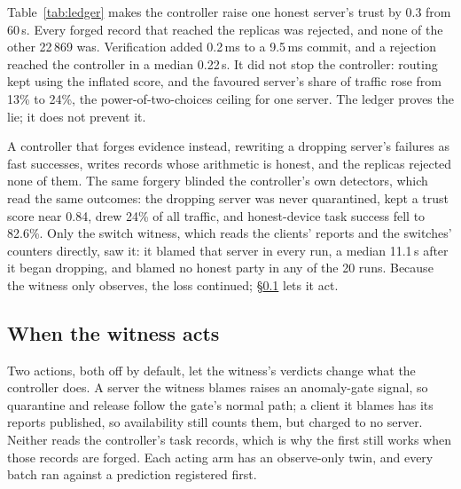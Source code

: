 \documentclass[10pt,twocolumn,letterpaper]{article}
\begin{document}
Table~\ref{tab:ledger} makes the controller raise one honest server's trust by
0.3 from 60\,s. Every forged record that reached the replicas was rejected,
and none of the other 22\,869 was. Verification added 0.2\,ms to a 9.5\,ms
commit, and a rejection reached the controller in a median 0.22\,s. It did
not stop the controller: routing kept using the inflated score, and the
favoured server's share of traffic rose from 13\% to 24\%, the
power-of-two-choices ceiling for one server. The ledger proves the lie; it
does not prevent it.

A controller that forges evidence instead, rewriting a dropping server's
failures as fast successes, writes records whose arithmetic is honest, and the
replicas rejected none of them. The same forgery blinded the controller's own
detectors, which read the same outcomes: the dropping server was never
quarantined, kept a trust score near 0.84, drew 24\% of all traffic, and
honest-device task success fell to 82.6\%. Only the switch witness, which
reads the clients' reports and the switches' counters directly, saw it: it
blamed that server in every run, a median 11.1\,s after it began dropping,
and blamed no honest party in any of the 20 runs. Because the witness only
observes, the loss continued; \S\ref{sec:res:witact} lets it act.

\subsection{When the witness acts}
\label{sec:res:witact}
Two actions, both off by default, let the witness's verdicts change what the
controller does. A server the witness blames raises an anomaly-gate signal, so
quarantine and release follow the gate's normal path; a client it blames has
its reports published, so availability still counts them, but charged to no
server. Neither reads the controller's task records, which is why the first
still works when those records are forged. Each acting arm has an observe-only
twin, and every batch ran against a prediction registered first.
\end{document}
